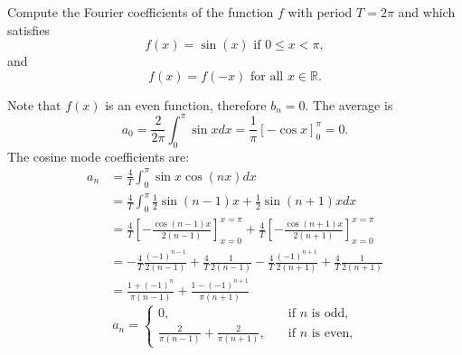 \documentclass[11pt]{article}
\begin{document}
\begin{exercise}
    Compute the Fourier coefficients of the function $f$ with period $T = 2\pi$ and which satisfies 
     \[
        f(x) = \sin(x) \text{ if } 0 \leq x  < \pi,
     \]
     and 
     \[
        f(x) = f(-x) \text{ for all } x \in \mathbb R.
     \]
\end{exercise}
\begin{solution}     
    Note that $f(x)$ is an even function,
    therefore $b_n = 0$. 
    The average is 
	\[
        a_0 = \frac{2}{2\pi} \int_{0}^{\pi} \sin x dx  =  \frac{1}{\pi}\left[ - \cos{x} \right]_{0}^{\pi} =0 .
    \]
    The cosine mode coefficients are:
    \begin{align*}
            a_n 
            &
            = 
            \frac{4}{T}
            \int_{0}^{\pi} \sin x \cos(n x) dx
            \\&
            =
            \frac{4}{T}
            \int_{0}^{\pi} \frac 1 2 \sin{(n-1)x} + \frac 1 2 \sin{(n+1)x} dx
            \\&
            =
           \frac{4}{T}
            \left[- \frac{ \cos(n-1)x }{ 2(n-1) } \right]_{x=0}^{x=\pi}
            +
            \frac{4}{T}
            \left[- \frac{ \cos(n+1)x }{ 2(n+1) } \right]_{x=0}^{x=\pi}
            \\&
            = 
            -\frac 4 T \frac{(-1)^{n-1}}{2(n-1)} + \frac 4 T \frac{1}{2(n-1)}  -\frac 4 T \frac{(-1)^{n+1}}{2(n+1)} + \frac 4 T \frac{1}{2(n+1)}
            \\&
            = \frac{1+(-1)^{n}}{\pi(n-1)} +  \frac{1-(-1)^{n+1}}{\pi(n+1)} 
        \end{align*}	
        \[
            a_n = 
            \begin{cases}
            0 ,\quad &\text{if } n\text{ is odd,}\\
            \frac{2}{\pi(n-1)} + \frac{2}{\pi(n+1)}  ,\quad &\text{if } n\text{ is even,}
            \end{cases}
        \]
\end{solution}
\end{document}
